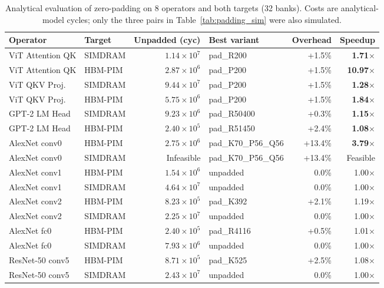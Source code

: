 \documentclass[conference]{IEEEtran}
\begin{document}
\begin{table}[t]
\caption{Analytical evaluation of zero-padding on 8 operators and both targets (32 banks). Costs are analytical-model cycles; only the three pairs in Table~\ref{tab:padding_sim} were also simulated.}
\label{tab:padding_results}
\centering\footnotesize
\begin{tabular}{llrlrr}
\toprule
Operator & Target & Unpadded (cyc) & Best variant & Overhead & Speedup \\
\midrule
ViT Attention QK & SIMDRAM & $1.14 \times 10^7$ & pad\_R200 & +1.5\% & \textbf{1.71$\times$} \\
ViT Attention QK & HBM-PIM & $2.87 \times 10^6$ & pad\_P200 & +1.5\% & \textbf{10.97$\times$} \\
ViT QKV Proj. & SIMDRAM & $9.44 \times 10^7$ & pad\_P200 & +1.5\% & \textbf{1.28$\times$} \\
ViT QKV Proj. & HBM-PIM & $5.75 \times 10^6$ & pad\_P200 & +1.5\% & \textbf{1.84$\times$} \\
GPT-2 LM Head & SIMDRAM & $9.23 \times 10^6$ & pad\_R50400 & +0.3\% & \textbf{1.15$\times$} \\
GPT-2 LM Head & HBM-PIM & $2.40 \times 10^5$ & pad\_R51450 & +2.4\% & \textbf{1.08$\times$} \\
AlexNet conv0 & HBM-PIM & $2.75 \times 10^6$ & pad\_K70\_P56\_Q56 & +13.4\% & \textbf{3.79$\times$} \\
AlexNet conv0 & SIMDRAM & Infeasible & pad\_K70\_P56\_Q56 & +13.4\% & Feasible \\
AlexNet conv1 & HBM-PIM & $1.54 \times 10^6$ & unpadded & 0.0\% & 1.00$\times$ \\
AlexNet conv1 & SIMDRAM & $4.64 \times 10^7$ & unpadded & 0.0\% & 1.00$\times$ \\
AlexNet conv2 & HBM-PIM & $8.23 \times 10^5$ & pad\_K392 & +2.1\% & 1.19$\times$ \\
AlexNet conv2 & SIMDRAM & $2.25 \times 10^7$ & unpadded & 0.0\% & 1.00$\times$ \\
AlexNet fc0 & HBM-PIM & $2.40 \times 10^5$ & pad\_R4116 & +0.5\% & 1.01$\times$ \\
AlexNet fc0 & SIMDRAM & $7.93 \times 10^6$ & unpadded & 0.0\% & 1.00$\times$ \\
ResNet-50 conv5 & HBM-PIM & $8.71 \times 10^5$ & pad\_K525 & +2.5\% & 1.08$\times$ \\
ResNet-50 conv5 & SIMDRAM & $2.43 \times 10^7$ & unpadded & 0.0\% & 1.00$\times$ \\
\bottomrule
\end{tabular}
\end{table}
\end{document}
